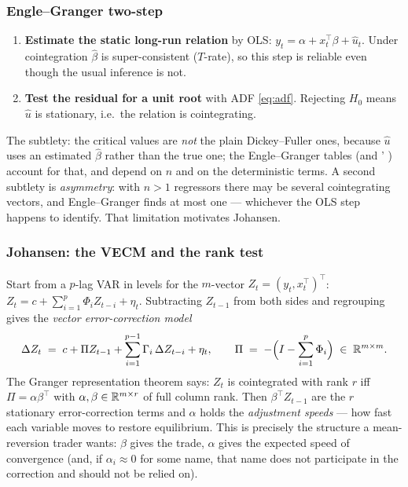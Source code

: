 \subsubsection{Engle--Granger two-step}
\label{sec:ts:eg}

\begin{enumerate}
  \item \textbf{Estimate the static long-run relation} by OLS:
    $y_t=\alpha+x_t^{\top}\beta+\hat u_t$. Under cointegration $\hat\beta$ is
    super-consistent ($T$-rate), so this step is reliable even though the usual inference
    is not.
  \item \textbf{Test the residual for a unit root} with ADF \eqref{eq:adf}. Rejecting
    $H_0$ means $\hat u$ is stationary, i.e.\ the relation is cointegrating.
\end{enumerate}
The subtlety: the critical values are \emph{not} the plain Dickey--Fuller ones, because
$\hat u$ uses an estimated $\hat\beta$ rather than the true one; the Engle--Granger
tables (and ' ) account for that, and depend on $n$ and on
the deterministic terms. A second subtlety is \emph{asymmetry}: with $n>1$ regressors
there may be several cointegrating vectors, and Engle--Granger finds at most one ---
whichever the OLS step happens to identify. That limitation motivates Johansen.

\subsubsection{Johansen: the VECM and the rank test}
\label{sec:ts:johansen}

Start from a $p$-lag VAR in levels for the $m$-vector $Z_t=(y_t,x_t^{\top})^{\top}$:
$Z_t = c + \sum_{i=1}^p \Phi_i Z_{t-i} + \eta_t$. Subtracting $Z_{t-1}$ from both sides
and regrouping gives the \emph{vector error-correction model}
\begin{equation}
  \Delta Z_t \;=\; c + \Pi Z_{t-1} + \sum_{i=1}^{p-1}\Gamma_i\,\Delta Z_{t-i} + \eta_t,
  \qquad
  \Pi \;=\; -\Bigl(I - \sum_{i=1}^p \Phi_i\Bigr) \;\in\; \mathbb{R}^{m\times m}.
  \label{eq:vecm}
\end{equation}
The Granger representation theorem says: $Z_t$ is cointegrated with rank $r$ iff
$\Pi=\alpha\beta^{\top}$ with $\alpha,\beta\in\mathbb{R}^{m\times r}$ of full column rank. Then
$\beta^{\top}Z_{t-1}$ are the $r$ stationary error-correction terms and $\alpha$ holds the
\emph{adjustment speeds} --- how fast each variable moves to restore equilibrium. This is
precisely the structure a mean-reversion trader wants: $\beta$ gives the trade, $\alpha$
gives the expected speed of convergence (and, if $\alpha_i\approx0$ for some name, that
name does not participate in the correction and should not be relied on).

